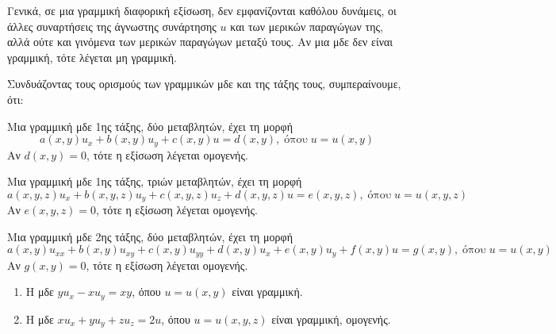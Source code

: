 \begin{rem}
  Γενικά, σε μια γραμμική διαφορική εξίσωση, δεν εμφανίζονται καθόλου δυνάμεις, οι άλλες 
  συναρτήσεις της άγνωστης συνάρτησης $ u $ και των μερικών παραγώγων της, αλλά ούτε και
  γινόμενα των μερικών παραγώγων μεταξύ τους. Αν μια μδε δεν είναι γραμμική, τότε 
  λέγεται \textcolor{Col1}{μη γραμμική}.
\end{rem}

\begin{rem} \item {}
  Συνδυάζοντας τους ορισμούς των γραμμικών μδε και της τάξης τους, συμπεραίνουμε, ότι:
  \begin{myitemize}
    \item Μια γραμμική μδε 1ης τάξης, δύο μεταβλητών, έχει τη μορφή
      \begin{equation} 
        a(x,y) u_{x} + b(x,y)u_{y} + c(x,y)u = d(x,y), \; \text{όπου} \; u=u(x,y) 
      \end{equation}
      Αν $ d(x,y)=0 $, τότε η εξίσωση λέγεται \textcolor{Col1}{ομογενής}.
    \item Μια γραμμική μδε 1ης τάξης, τριών μεταβλητών, έχει τη μορφή
      \begin{equation} 
        a(x,y,z) u_{x} + b(x,y,z)u_{y} + c(x,y,z)u_{z} + d(x,y,z)u = e(x,y,z), 
        \; \text{όπου} \; u=u(x,y,z)  
      \end{equation} 
      Αν $ e(x,y,z)=0 $, τότε η εξίσωση λέγεται \textcolor{Col1}{ομογενής}.
    \item Μια γραμμική μδε 2ης τάξης, δύο μεταβλητών, έχει τη μορφή
      \begin{equation} 
        a(x,y)u_{xx} + b(x,y)u_{xy} + c(x,y)u_{yy} + d(x,y)u_{x} + e(x,y)u_{y} +
        f(x,y)u =g(x,y), \; \text{όπου} \; u=u(x,y) 
      \end{equation} 
      Αν $ g(x,y)=0 $, τότε η εξίσωση λέγεται \textcolor{Col1}{ομογενής}.
  \end{myitemize}
\end{rem}

\begin{examples} \item {}
  \begin{enumerate}
    \item Η μδε $ yu_{x}-xu_{y}=xy $, όπου $ u=u(x,y) $  είναι γραμμική.
    \item Η μδε $ xu_{x}+yu_{y}+zu_{z}=2u $, όπου $ u=u(x,y,z) $  είναι γραμμική,
      ομογενής.
  \end{enumerate}
\end{examples}


